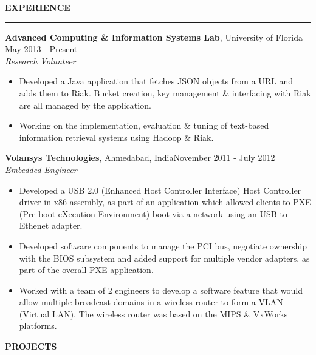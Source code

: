 \documentclass[10pt, a4paper]{article}
\begin{document}
\MakeUppercase{\bf Experience}
\smallskip
\hrule
{\bf Advanced Computing \& Information Systems Lab}, University of Florida \hfill May 2013 - Present\\
\textit{Research Volunteer}
\begin{itemize}
    \item Developed a Java application that fetches JSON objects from a URL and adds them to Riak. Bucket creation, key management \& interfacing with Riak are all managed by the application. %
    \item Working on the implementation, evaluation \& tuning of text-based information retrieval systems using Hadoop \& Riak.%
\end{itemize}
{\bf Volansys Technologies}, Ahmedabad, India\hfill November 2011 - July 2012\\
\textit{Embedded Engineer}
\begin{itemize}
    \item Developed a USB 2.0 (Enhanced Host Controller Interface) Host Controller driver in x86 assembly, as part of an application which allowed clients to PXE (Pre-boot eXecution Environment) boot via a network using an USB to Ethenet adapter. %
    \item Developed software components to manage the PCI bus, negotiate ownership with the BIOS subsystem and added support for multiple vendor adapters, as part of the overall PXE application. %
    \item Worked with a team of 2 engineers to develop a software feature that would allow multiple broadcast domains in a wireless router to form a VLAN (Virtual LAN). The wireless router was based on the MIPS \& VxWorks platforms.
\end{itemize}
\MakeUppercase{\bf Projects}
\end{document}
